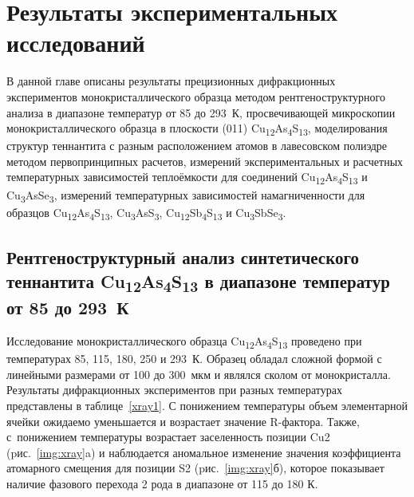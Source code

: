 \chapter{Результаты экспериментальных исследований} \label{chapt3}
В данной главе описаны результаты прецизионных дифракционных экспериментов монокристаллического образца методом рентгеноструктурного анализа в диапазоне температур от 85 до 293~К, просвечивающей микроскопии монокристаллического образца в плоскости (011) Cu\textsubscript{12}As\textsubscript{4}S\textsubscript{13}, 
моделирования структур теннантита с разным расположением атомов в лавесовском полиэдре методом первопринципных расчетов, 
измерений экспериментальных и расчетных температурных зависимостей теплоёмкости для соединений Cu\textsubscript{12}As\textsubscript{4}S\textsubscript{13} и Cu\textsubscript{3}AsSe\textsubscript{3},  
измерений температурных зависимостей намагниченности для образцов Cu\textsubscript{12}As\textsubscript{4}S\textsubscript{13}, Cu\textsubscript{3}AsS\textsubscript{3}, Cu\textsubscript{12}Sb\textsubscript{4}S\textsubscript{13} и Cu\textsubscript{3}SbSe\textsubscript{3}.



\section{Рентгеноструктурный анализ синтетического теннантита Cu\textsubscript{12}As\textsubscript{4}S\textsubscript{13} в диапазоне температур от 85 до 293~К} \label{sect3_1}

Исследование монокристаллического образца  Cu\textsubscript{12}As\textsubscript{4}S\textsubscript{13} проведено при температурах 85, 115, 180, 250 и 293~К. Образец обладал сложной формой с линейными размерами от 100 до 300~мкм и являлся сколом от монокристалла.  Результаты дифракционных экспериментов при разных температурах представлены в таблице~\ref{xray1}. С понижением температуры объем элементарной ячейки ожидаемо уменьшается и возрастает значение R-фактора. 
Также, с~понижением температуры возрастает заселенность позиции Cu2 (pис.~\ref{img:xray}a) и  наблюдается аномальное изменение значения коэффициента атомарного смещения для позиции S2 (pис.~\ref{img:xray}б), которое показывает наличие фазового перехода 2 рода в диапазоне от 115 до 180 К.

